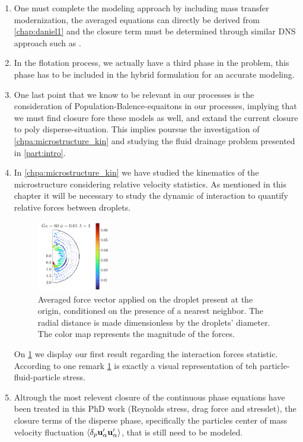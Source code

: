 \begin{enumerate}
    \item One must complete the modeling approach by including mass transfer modernization, the averaged equations can directly be derived from \ref{chap:daniel1} and the closure term must be determined through similar DNS approach such as \citep{hidman2023assessing}. 
    \item In the flotation process, we actually have a third phase in the problem, this phase has to be included in the hybrid formulation for an accurate modeling. 
    \item One last point that we know to be relevant in our processes is the consideration of Population-Balence-equaitons in our processes, implying that we must find closure fore these models as well, and extand the current closure to poly disperse-situation. 
    This implies poursue the investigation of \ref{chpa:microstructure_kin} and studying the fluid drainage problem presented in \ref{part:intro}. 
    \item In \ref{chpa:microstructure_kin} we have studied the kinematics   of the microstructure considering relative velocity statistics. 
    As mentioned in this chapter it will be necessary to study the dynamic of interaction to quantify relative forces between droplets. 
    \begin{figure}[h!]
        \centering
        \includegraphics[width=0.3\textwidth]{image/HOMOGENEOUS_final/Dist/F_rel_l_1_Ga_80_PHI_5}
        \caption{Averaged force vector applied on the droplet present at the origin, conditioned on the presence of a nearest neighbor.
        The radial distance is made dimensionless by the droplets' diameter. 
        The color map represents the magnitude of the forces.}
        \label{fig:perspective_forces}
    \end{figure}
    On \ref{fig:perspective_forces} we display our first result regarding the interaction forces statistic. 
    According to \citet{zhang2021ensemble} one remark \ref{fig:perspective_forces} is exactly a visual representation of teh particle-fluid-particle stress. 
    \item Altrough the most relevent closure of the continuous phase equations have been treated in this PhD work (Reynolds stress, drag force and stresslet), the closure terms of the disperse phase, specifically the particles center of mass velocity fluctuation $\left<\delta_p \textbf{u}_\alpha'\textbf{u}_\alpha'\right>$, that is still need to be modeled. 

\end{enumerate}
